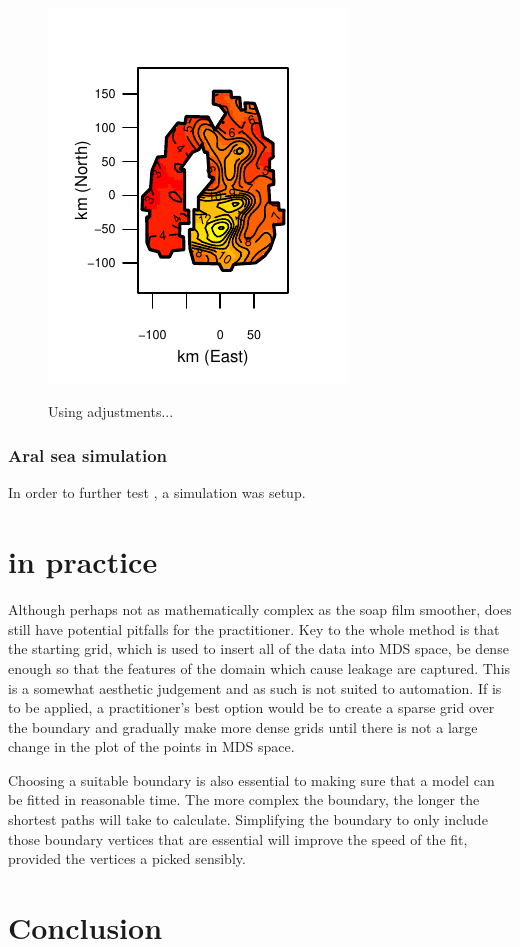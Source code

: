 \begin{figure}
\centering
\includegraphics{mds/figs/aral-adjfit.pdf} \\
\caption{Using adjustments...}
\label{aral-fit}
\end{figure}


\subsubsection{Aral sea simulation}

In order to further test \mdsap, a simulation was setup. 


\section{\mdsap in practice}

Although perhaps not as mathematically complex as the soap film smoother, \mdsap does still have potential pitfalls for the practitioner. Key to the whole method is that the starting grid, which is used to insert all of the data into MDS space, be dense enough so that the features of the domain which cause leakage are captured. This is a somewhat aesthetic judgement and as such is not suited to automation. If \mdsap is to be applied, a practitioner's best option would be to create a sparse grid over the boundary and gradually make more dense grids until there is not a large change in the plot of the points in MDS space.

Choosing a suitable boundary is also essential to making sure that a model can be fitted in reasonable time. The more complex the boundary, the longer the shortest paths will take to calculate. Simplifying the boundary to only include those boundary vertices that are essential will improve the speed of the fit, provided the vertices a picked sensibly.


\section{Conclusion}


